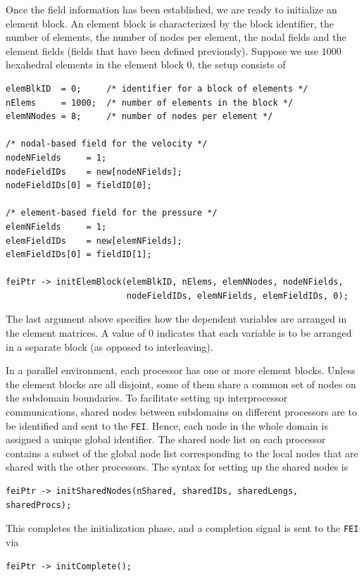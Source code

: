 Once the field information has been established, we are ready to initialize
an element block. An element block is characterized by the block identifier,
the number of elements, the number of nodes per element, the nodal fields 
and the element fields (fields that have been defined previously). Suppose 
we use $1000$ hexahedral elements in the element block $0$, the setup 
consists of
\begin{display}
\begin{verbatim}
elemBlkID  = 0;     /* identifier for a block of elements */
nElems     = 1000;  /* number of elements in the block */
elemNNodes = 8;     /* number of nodes per element */

/* nodal-based field for the velocity */
nodeNFields     = 1;
nodeFieldIDs    = new[nodeNFields];
nodeFieldIDs[0] = fieldID[0];

/* element-based field for the pressure */
elemNFields     = 1;
elemFieldIDs    = new[elemNFields];
elemFieldIDs[0] = fieldID[1];

feiPtr -> initElemBlock(elemBlkID, nElems, elemNNodes, nodeNFields,
                        nodeFieldIDs, elemNFields, elemFieldIDs, 0);
\end{verbatim}
\end{display}
The last argument above specifies how the dependent variables are arranged in
the element matrices. A value of $0$ indicates that each variable is to be
arranged in a separate block (as opposed to interleaving).

In a parallel environment, each processor has one or more element blocks.
Unless the element blocks are all disjoint, some of them
share a common set of nodes on the subdomain boundaries. To facilitate
setting up interprocessor communications, shared nodes between subdomains
on different processors are to be identified and sent to the {\tt FEI}.
Hence, each node in the whole domain is assigned a unique global
identifier. The shared node list on each processor contains a subset
of the global node list
corresponding to the local nodes that are shared with the other processors.
The syntax for setting up the shared nodes is
\begin{display}
\begin{verbatim}
feiPtr -> initSharedNodes(nShared, sharedIDs, sharedLengs, sharedProcs);
\end{verbatim}
\end{display}
This completes the initialization phase, and a completion signal is sent to
the {\tt FEI} via
\begin{display}
\begin{verbatim}
feiPtr -> initComplete();
\end{verbatim}
\end{display}

